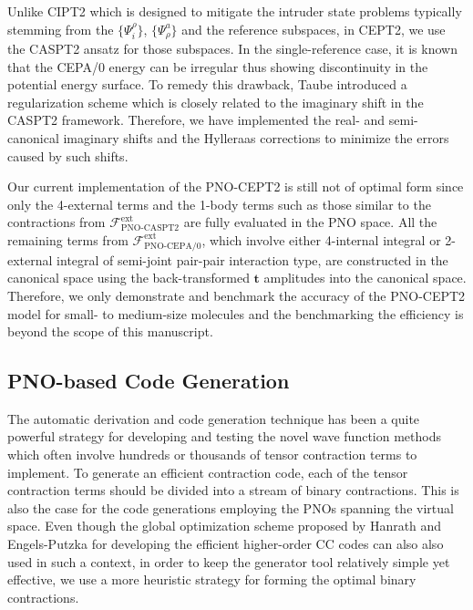 \documentclass[aip,jcp,amsmath,twocolumn,floatfix,reprint,fleqn]{revtex4-1}
\begin{document}
%
Unlike CIPT2 which is designed to mitigate the intruder state problems typically stemming from the $\{\Psi_i^\rho\}$, $\{\Psi_\rho^a\}$ and the reference subspaces, in CEPT2, we use the CASPT2 ansatz for those subspaces.
%
In the single-reference case, it is known that the CEPA/0 energy can be irregular thus showing discontinuity in the potential energy surface.
%
To remedy this drawback, Taube introduced a regularization scheme which is closely related to the imaginary shift in the CASPT2 framework.\cite{doi:10.1063/1.3115467}
%
Therefore, we have implemented the real- and semi-canonical imaginary shifts and the Hylleraas corrections to minimize the errors caused by such shifts.

%
Our current implementation of the PNO-CEPT2 is still not of optimal form since only the 4-external terms and the 1-body terms such as those similar to the contractions from $\mathscr{F}_\text{PNO-CASPT2}^\text{ext}$ are fully evaluated in the PNO space.
%
All the remaining terms from $\mathscr{F}_\text{PNO-CEPA/0}^\text{ext}$, which involve either 4-internal integral or 2-external integral of semi-joint pair-pair interaction type,\cite{neeseefficient2009cepa,neeseefficient2009} are constructed in the canonical space using the back-transformed $\mathbf{t}$ amplitudes into the canonical space.
%
Therefore, we only demonstrate and benchmark the accuracy of the PNO-CEPT2 model for small- to medium-size molecules and the benchmarking the efficiency is beyond the scope of this manuscript.

\subsection{PNO-based Code Generation}
%
The automatic derivation and code generation technique has been a quite powerful strategy for developing and testing the novel wave function methods which often involve hundreds or thousands of tensor contraction terms to implement.\cite{CJanssen1991,doi:10.1021/jp034596z,SHirataTCE2004,SHirataTCE2006,doi:10.1080/00268970500275780,KoehnJCP2009_1,KoehnJCP2009_2,MHandKoehn2009,MHandKoehn2011,AK74,AK77,ShiozakiJCP2008,ShiozakiPCCP2008,ShiozakiJCP2009_1,ShiozakiJCP2009_2,doi:10.1063/1.4907717,doi:10.1063/1.4959029,doi:10.1002/jcc.24833,doi:10.1063/1.5001320,doi:10.1063/1.5048688,dattaa2011,doi:10.1063/1.3089302,doi:10.1063/1.3664729,PCMRCI2011}
%
To generate an efficient contraction code, each of the tensor contraction terms should be divided into a stream of binary contractions.
%
This is also the case for the code generations employing the PNOs spanning the virtual space.
%
Even though the global optimization scheme proposed by Hanrath and Engels-Putzka for developing the efficient higher-order CC codes\cite{hanrathan2010,engels-putzkaa2011} can also also used in such a context, in order to keep the generator tool relatively simple yet effective, we use a more heuristic strategy for forming the optimal binary contractions.
\end{document}
